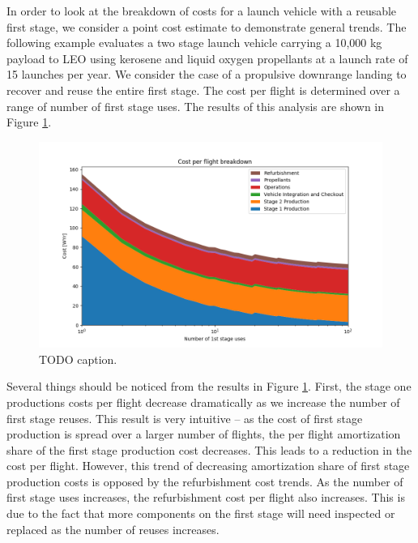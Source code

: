 \documentclass[conf]{new-aiaa}
\begin{document}
In order to look at the breakdown of costs for a launch vehicle with a reusable first stage, we consider a point cost estimate to demonstrate general trends. The following example evaluates a two stage launch vehicle carrying a 10,000 kg payload to LEO using kerosene and liquid oxygen propellants at a launch rate of 15 launches per year. We consider the case of a propulsive downrange landing to recover and reuse the entire first stage. The cost per flight is determined over a range of number of first stage uses. The results of this analysis are shown in Figure \ref{fig:cpf_stackplot_reuses_sweep}.

\begin{figure}[hbt!]
    \centering
    \includegraphics[width=\textwidth]{../../lvreuse/analysis/combined/plots/cpf_stackplot_reuses_sweep}
    \caption{\label{fig:cpf_stackplot_reuses_sweep} TODO caption.}
\end{figure}

Several things should be noticed from the results in Figure \ref{fig:cpf_stackplot_reuses_sweep}. First, the stage one productions costs per flight decrease dramatically as we increase the number of first stage reuses. This result is very intuitive -- as the cost of first stage production is spread over a larger number of flights, the per flight amortization share of the first stage production cost decreases. This leads to a reduction in the cost per flight. However, this trend of decreasing amortization share of first stage production costs is opposed by the refurbishment cost trends. As the number of first stage uses increases, the refurbishment cost per flight also increases. This is due to the fact that more components on the first stage will need inspected or replaced  as the number of reuses increases. 
\end{document}
